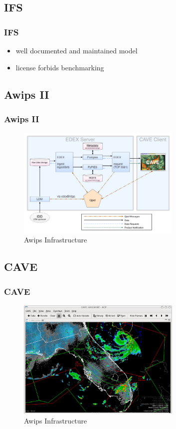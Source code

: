 \documentclass[compress]{beamer}
\begin{document}
\subsection{IFS}
\begin{frame}
	\frametitle{IFS}
	\begin{itemize}
		\item well documented and maintained model
		\item license forbids benchmarking
	\end{itemize}
\end{frame}

\subsection{Awips II}
\begin{frame}
    \frametitle{Awips II}
    \begin{center}
    	\begin{figure}
			\includegraphics[width=0.7\textwidth]{gfx/awipsII.png}
      	  	\caption[]{Awips Infrastructure \cite{Uni01}}
		\end{figure}
	\end{center}
\end{frame}

\subsection{CAVE}
\begin{frame}
    \frametitle{CAVE}
    \begin{center}
    	\begin{figure}
			\includegraphics[width=0.7\textwidth]{gfx/Unidata_AWIPS2_CAVE.png}
      	  	\caption[]{Awips Infrastructure \cite{Uni01}}
		\end{figure}
	\end{center}

\end{frame}
\end{document}
